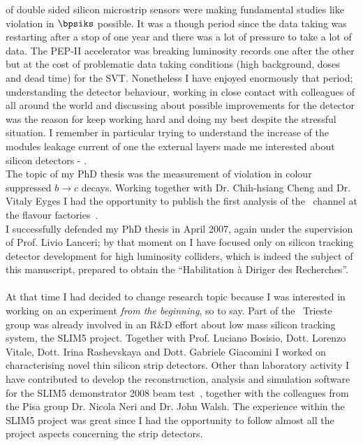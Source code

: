of double sided silicon microstrip sensors were making fundamental studies like \CP violation in $\bpsiks$ 
possible. It was a though period since the data taking was restarting after a stop of one year and there 
was a lot of pressure to take a lot of data. The PEP-II accelerator was breaking luminosity records 
one after the other but at the cost of problematic data taking conditions (high background, doses 
and dead time) for the SVT. Nonetheless I have enjoyed enormously that period; understanding 
the detector behaviour, working in close contact with colleagues of all around the world and discussing 
about possible improvements for the detector was the reason for keep working hard and doing my best 
despite the stressful situation. I remember in particular trying to understand the increase of the modules 
leakage current of one the external layers made me interested about silicon detectors 
- \cite{babar_leakage}.
\\The topic of my PhD thesis was the measurement of \CP violation in colour suppressed $b\to c$ decays.
Working together with Dr. Chih-hsiang Cheng and Dr.  Vitaly Eyges I had the opportunity to publish 
the first analysis of the \BDh\ channel at the flavour factories~\cite{PhysRevLett.99.081801}.
\\ I successfully defended my PhD thesis in April 2007, again under the supervision of Prof. Livio Lanceri;
  by that moment on I have focused only on 
silicon tracking detector development for high luminosity colliders, which is indeed the subject of this 
manuscript, prepared to obtain the  ``Habilitation \`a Diriger des Recherches''.
\\
\\
At that time I had decided to change research topic because I was interested in working on an experiment 
{\it from the beginning}, so to say. Part of the   \babar\ Trieste group was already involved in an R\&D 
effort about low mass silicon tracking system, the SLIM5 project. 
Together with Prof. Luciano Bosisio, Dott. Lorenzo Vitale, Dott. Irina Rashevskaya and Dott. Gabriele 
Giacomini I worked on characterising novel thin silicon strip detectors. Other than laboratory activity 
I have contributed to develop the reconstruction, analysis and simulation software for the SLIM5 
demonstrator 2008 beam test~\cite{BETTARINI2010942}, together with the colleagues from the Pisa group 
Dr. Nicola Neri and Dr. John Walsh.  
The experience within the SLIM5 project  was great since I had the opportunity to follow almost all the  
project aspects concerning the strip detectors. 
